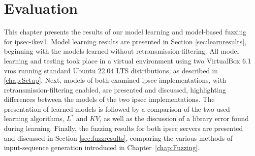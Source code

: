 %
%
% 

\chapter{Evaluation} \label{chap:Evaluation}

This chapter presents the results of our model learning and model-based fuzzing for \ac{ipsec}-\ac{ike}v1. Model learning results are presented in Section \ref{sec:learnresults}, beginning with the models learned without retransmission-filtering. All model learning and testing took place in a virtual environment using two VirtualBox 6.1 \acp{vm} running standard Ubuntu 22.04 LTS distributions, as described in \ref{chap:Setup}. Next, models of both examined \ac{ipsec} implementations, with retransmission-filtering enabled, are presented and discussed, highlighting differences between the models of the two \ac{ipsec} implementations. The presentation of learned models is followed by a comparison of the two used learning algorithms, $L^*$ and $KV$, as well as the discussion of a library error found during learning. Finally, the fuzzing results for both \ac{ipsec} servers are presented and discussed in Section \ref{sec:fuzzresults}, comparing the various methods of input-sequence generation introduced in Chapter~\ref{chap:Fuzzing}.

\iffalse
